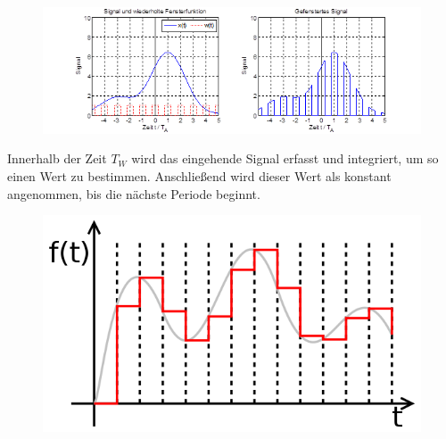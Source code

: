 \begin{figure}[h!]
\centering
\includegraphics[scale=1]{images/abtastung_real.png}
\label{real_abtastung}
\end{figure}

Innerhalb der Zeit $T_W$ wird das eingehende Signal erfasst und integriert, um so einen Wert zu bestimmen. Anschließend wird dieser Wert als konstant angenommen, bis die nächste Periode beginnt. 

\begin{figure}[h!]
\centering
\includegraphics[scale=0.4]{images/sah_signal.png}
\label{sah_signal}
\end{figure}

